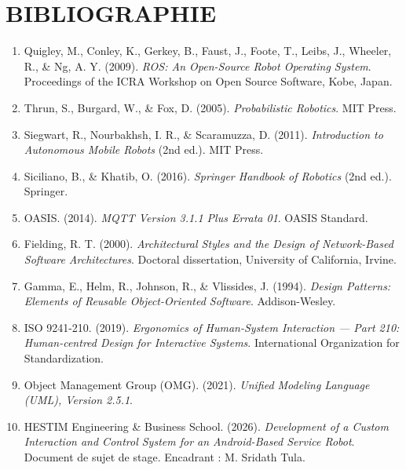 \section*{\centering BIBLIOGRAPHIE}

\begin{enumerate}

\item Quigley, M., Conley, K., Gerkey, B., Faust, J., Foote, T., Leibs, J.,
Wheeler, R., \& Ng, A. Y. (2009).
\textit{ROS: An Open-Source Robot Operating System}.
Proceedings of the ICRA Workshop on Open Source Software, Kobe, Japan.

\item Thrun, S., Burgard, W., \& Fox, D. (2005).
\textit{Probabilistic Robotics}.
MIT Press.

\item Siegwart, R., Nourbakhsh, I. R., \& Scaramuzza, D. (2011).
\textit{Introduction to Autonomous Mobile Robots} (2nd ed.).
MIT Press.

\item Siciliano, B., \& Khatib, O. (2016).
\textit{Springer Handbook of Robotics} (2nd ed.).
Springer.

\item OASIS. (2014).
\textit{MQTT Version 3.1.1 Plus Errata 01}.
OASIS Standard.

\item Fielding, R. T. (2000).
\textit{Architectural Styles and the Design of Network-Based Software Architectures}.
Doctoral dissertation, University of California, Irvine.

\item Gamma, E., Helm, R., Johnson, R., \& Vlissides, J. (1994).
\textit{Design Patterns: Elements of Reusable Object-Oriented Software}.
Addison-Wesley.

\item ISO 9241-210. (2019).
\textit{Ergonomics of Human-System Interaction — Part 210: Human-centred Design for Interactive Systems}.
International Organization for Standardization.

\item Object Management Group (OMG). (2021).
\textit{Unified Modeling Language (UML), Version 2.5.1}.

\item HESTIM Engineering \& Business School. (2026).
\textit{Development of a Custom Interaction and Control System for an Android-Based Service Robot}.
Document de sujet de stage. Encadrant : M. Sridath Tula.

\end{enumerate}
